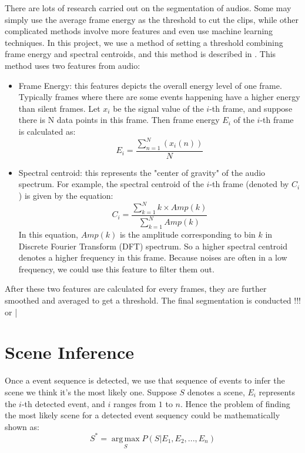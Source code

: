 There are lots of research carried out on the segmentation of audios.
Some may simply use the average frame energy as the threshold to cut the clips, while other complicated methods involve more features and even use machine learning techniques. 
In this project, we use a method of setting a threshold combining frame energy and spectral centroids, and this method is described in \cite{giannakopoulos2009method}.
This method uses two features from audio:
\begin{itemize}
\item{Frame Energy: this features depicts the overall energy level of one frame. 
Typically frames where there are some events happening have a higher energy than silent frames.
Let $x_i$ be the signal value of the $i$-th frame, and suppose there is N data points in this frame. 
Then frame energy $E_i$ of the $i$-th frame is calculated as:  
\begin{equation}
E_i = \frac{\sum\limits_{n=1}^N(x_i(n))}{N}
\end{equation}
}
\item{Spectral centroid: this represents the "center of gravity" of the audio spectrum. For example, the spectral centroid of the $i$-th frame (denoted by $ C_i$) is given by the equation:
\begin{equation}
C_i = \frac{\sum\limits_{k=1}^Nk\times Amp(k)}{\sum\limits_{k=1}^NAmp(k)}
\end{equation}
In this equation, $Amp(k)$ is the amplitude corresponding to bin $k$ in Discrete Fourier Transform (DFT) spectrum. 
So a higher spectral centroid denotes a higher frequency in this frame. Because noises are often in a low frequency, we could use this feature to filter them out. 
}
\end{itemize}

After these two features are calculated for every frames, they are further smoothed and averaged to get a threshold. 
The final segmentation is conducted 
!!!  or | 

\section{Scene Inference}
Once a event sequence is detected, we use that sequence of events to infer the scene we think it's the most likely one. 
Suppose $S$ denotes a scene, $E_i$ represents the $i$-th detected event, and $i$ ranges from $1$ to $n$. 
Hence the problem of finding the most likely scene for a detected event sequency could be mathematically shown as: 
\begin{equation}
S^* = \operatorname*{arg\,max}_{S} P(S|E_1,E_2,...,E_n)
\end{equation} 

